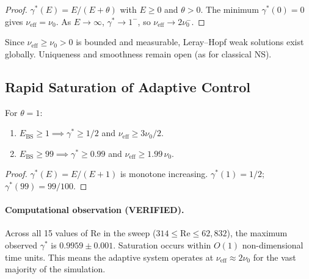 \begin{proof}
$\gamma^*(E) = E/(E+\theta)$ with $E \ge 0$ and $\theta > 0$.
The minimum $\gamma^*(0) = 0$ gives $\nu_{\mathrm{eff}} = \nu_0$.
As $E \to \infty$, $\gamma^* \to 1^-$, so
$\nu_{\mathrm{eff}} \to 2\nu_0^-$.
\end{proof}

\begin{corollary}
Since $\nu_{\mathrm{eff}} \ge \nu_0 > 0$ is bounded and measurable,
Leray--Hopf weak solutions exist globally.  Uniqueness and smoothness
remain open (as for classical NS).
\end{corollary}

\subsection{Rapid Saturation of Adaptive Control}
\label{app:ns:saturation}

\begin{proposition}\label{prop:saturation}
For $\theta = 1$:
\begin{enumerate}
\item[\textup{(i)}]  $E_{\mathrm{BS}} \ge 1 \implies  \gamma^* \ge 1/2$
  and $\nu_{\mathrm{eff}} \ge 3\nu_0/2$.
\item[\textup{(ii)}] $E_{\mathrm{BS}} \ge 99 \implies \gamma^* \ge 0.99$
  and $\nu_{\mathrm{eff}} \ge 1.99\,\nu_0$.
\end{enumerate}
\end{proposition}

\begin{proof}
$\gamma^*(E) = E/(E+1)$ is monotone increasing.
$\gamma^*(1)=1/2$; $\gamma^*(99)=99/100$.
\end{proof}

\paragraph{Computational observation (VERIFIED).}
Across all 15 values of Re in the sweep
($314 \le \mathrm{Re} \le 62{,}832$), the maximum observed
$\gamma^*$ is $0.9959 \pm 0.001$.  Saturation occurs within
$O(1)$ non-dimensional time units.  This means the adaptive
system operates at $\nu_{\mathrm{eff}} \approx 2\nu_0$ for
the vast majority of the simulation.

